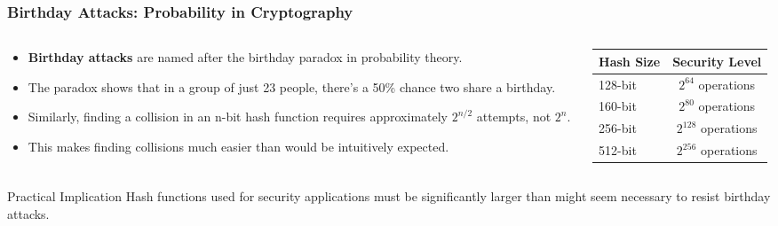\documentclass{beamer}
\begin{document}
\begin{frame}
    \frametitle{Birthday Attacks: Probability in Cryptography}
    
    \begin{columns}
        \begin{column}{0.5\textwidth}
            \begin{itemize}
                \item \textbf{Birthday attacks} are named after the birthday paradox in probability theory.
                \item The paradox shows that in a group of just 23 people, there's a 50\% chance two share a birthday.
                \item Similarly, finding a collision in an n-bit hash function requires approximately $2^{n/2}$ attempts, not $2^n$.
                \item This makes finding collisions much easier than would be intuitively expected.
            \end{itemize}
        \end{column}
        \begin{column}{0.5\textwidth}
            \begin{table}
                \centering
                \small
                \begin{tabular}{l|c}
                    \textbf{Hash Size} & \textbf{Security Level} \\
                    \hline
                    128-bit & $2^{64}$ operations \\
                    160-bit & $2^{80}$ operations \\
                    256-bit & $2^{128}$ operations \\
                    512-bit & $2^{256}$ operations \\
                \end{tabular}
            \end{table}
        \end{column}
    \end{columns}
    
    \begin{block}{Practical Implication}
        Hash functions used for security applications must be significantly larger than might seem necessary to resist birthday attacks.
    \end{block}
\end{frame}
\end{document}
